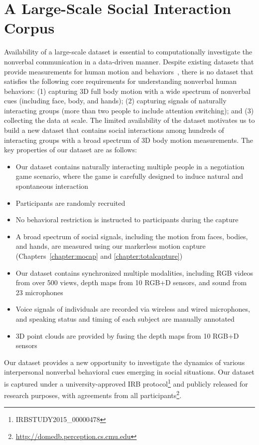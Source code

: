
\chapter{A Large-Scale Social Interaction Corpus}
\label{chapter:dataset}
Availability of a large-scale dataset is essential to computationally investigate the nonverbal communication in a data-driven manner. Despite existing datasets that provide measurements for human motion and behaviors~\cite{carletta2005ami, Lepri-12, Zen-10,Cristani-11, SALSA-15, h36m_pami}, there is no dataset that satisfies the following core requirements for understanding nonverbal human behaviors: (1) capturing 3D full body motion with a wide spectrum of nonverbal cues (including face, body, and hands); (2) capturing signals of naturally interacting groups (more than two people to include attention switching); and (3) collecting the data at scale. The limited availability of the dataset motivates us to build a new dataset that contains social interactions among hundreds of interacting groups with a broad spectrum of 3D body motion measurements. The key properties of our dataset are as follows:
\begin{itemize}
	\item Our dataset contains naturally interacting multiple people in a negotiation game scenario, where the game is carefully designed to induce natural and spontaneous interaction
	\item Participants   are randomly recruited
	\item No behavioral restriction is instructed to participants during the capture
	\item A broad spectrum of social signals, including the motion from faces, bodies, and hands, are measured using our markerless motion capture (Chapters~\ref{chapter:mocap} and \ref{chapter:totalcapture})
		\item Our dataset contains synchronized multiple modalities, including RGB videos from over 500 views, depth maps from 10 RGB+D sensors, and sound from 23 microphones  
		\item Voice signals of individuals are recorded via wireless and wired microphones, and speaking status and timing of each subject are manually annotated
		\item 3D point clouds are provided by fusing the depth maps from 10 RGB+D sensors
	\end{itemize}
	
	Our dataset provides a new opportunity to investigate the dynamics of various interpersonal nonverbal behavioral cues emerging in social situations. Our dataset is captured under a university-approved IRB protocol\footnote{IRBSTUDY2015\_00000478} and publicly released for research purposes, with agreements from all participants\footnote{\url{http://domedb.perception.cs.cmu.edu}}. 


